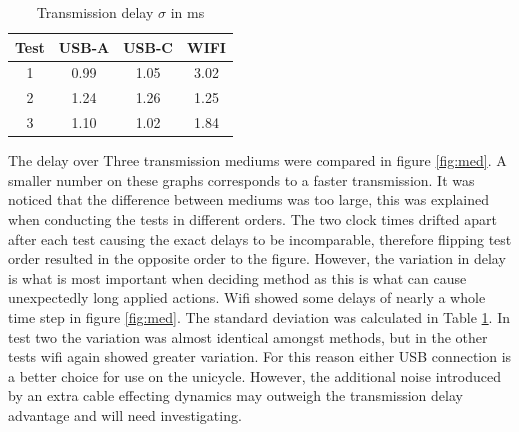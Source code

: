 \documentclass[twoside,twocolumn,12pt]{article}
\begin{document}
\begin{table}[h]
\centering
\begin{tabular}{ c | c | c | c }
Test& USB-A & USB-C & WIFI\\ 
\midrule
1&0.99&1.05 &3.02\\
2&1.24& 1.26&1.25\\
3&1.10&1.02 &1.84\\
\end{tabular}
\caption{Transmission delay $\sigma$ in ms}
\label{table:td}
\end{table}
The delay over Three transmission mediums were compared in figure \ref{fig:med}. A smaller number on these graphs corresponds to a faster transmission. It was noticed that the difference between mediums was too large, this was explained when conducting the tests in different orders. The two clock times drifted apart after each test causing the exact delays to be incomparable, therefore flipping test order resulted in the opposite order to the figure. However, the variation in delay is what is most important when deciding method as this is what can cause unexpectedly long applied actions. Wifi showed some delays of nearly a whole time step in figure \ref{fig:med}. The standard deviation was calculated in Table \ref{table:td}. In test two the variation was almost identical amongst methods, but in the other tests wifi again showed greater variation. For this reason either USB connection is a better choice for use on the unicycle. However, the additional noise introduced by an extra cable effecting dynamics  may outweigh the transmission delay advantage and will need investigating. 
\end{document}
